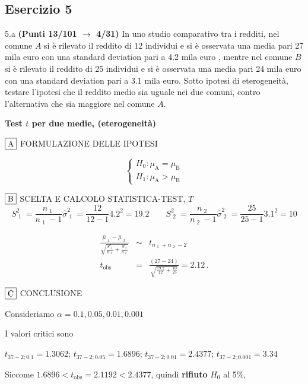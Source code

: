 \documentclass[
  11pt,
]{book}
\theoremstyle{mytheoremstyle}
\theoremstyle{mydefstyle}
\newenvironment{sol}
  {
  \begin{tcolorbox}[enhanced,breakable,arc=0.1mm,boxrule=1pt,colback=white,colframe=iblue,
  title=\bf \fontfamily{lmss}\selectfont \hspace{.5 cm} Soluzione,drop fuzzy shadow]

}{
\end{tcolorbox}
  }
\begin{document}
\subsection{Esercizio 5}\label{esercizio-5-21}

5.a \textbf{(Punti 13/101 \(\rightarrow\) 4/31)} In uno studio comparativo tra i redditi, nel comune \(A\) si è rilevato il reddito di 12 individui e si è osservata una media pari 27 mila euro con una standard deviation pari a 4.2 mila euro , mentre nel comune \(B\) si è rilevato il reddito di 25 individui e si è osservata una media pari 24 mila euro con una standard deviation pari a 3.1 mila euro.
Sotto ipotesi di eterogeneità, testare l'ipotesi che il reddito medio sia uguale nei due comuni, contro l'alternativa che sia maggiore nel comune \(A\).

\begin{sol}
\textbf{Test \(t\) per due medie, (eterogeneità)}

\(\fbox{A}\) FORMULAZIONE DELLE IPOTESI

\[\begin{cases}
   H_0: \mu_\text{A} = \mu_\text{B} \\
   H_1: \mu_\text{A} > \mu_\text{B} 
   \end{cases}\]

\(\fbox{B}\) SCELTA E CALCOLO STATISTICA-TEST, \(T\)
\[
     S^2_\text{ 1 }=\frac{n_\text{ 1 }}{n_\text{ 1 }-1}\hat\sigma^2_\text{ 1 }=\frac{ 12 }{ 12 -1} 4.2 ^2= 19.2  \qquad
     S^2_\text{ 2 }=\frac{n_\text{ 2 }}{n_\text{ 2 }-1}\hat\sigma^2_\text{ 2 }=\frac{ 25 }{ 25 -1} 3.1 ^2= 10 
   \]

\begin{eqnarray*}
   \frac{\hat\mu_\text{ 1 } - \hat\mu_\text{ 2 }}
   {\sqrt{\frac {S^2_\text{ 1 }}{n_\text{ 1 }}+\frac {S^2_\text{ 2 }}{n_\text{ 2 }}}}&\sim&t_{n_\text{ 1 }+n_\text{ 2 }-2}\\
   t_{\text{obs}}
   &=& \frac{ ( 27 -  24 )} {\sqrt{\frac{ 19.2 }{ 12 }+\frac{ 10 }{ 25 }}}
   =   2.12 \, .
   \end{eqnarray*}

\(\fbox{C}\) CONCLUSIONE

Consideriamo \(\alpha=0.1, 0.05, 0.01, 0.001\)

I valori critici sono

\(t_{37-2;0.1}=1.3062\); \(t_{37-2;0.05}=1.6896\); \(t_{37-2;0.01}=2.4377\); \(t_{37-2;0.001}=3.34\)

Siccome \(1.6896<t_\text{obs}=2.1192<2.4377\), quindi \textbf{rifiuto} \(H_0\) al 5\%,


\end{sol}
\end{document}
